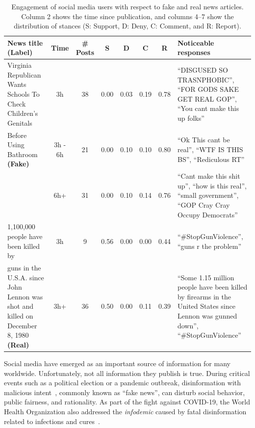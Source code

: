 \documentclass[sigconf]{acmart}
\theoremstyle{definition}
\theoremstyle{hypothesis}
\begin{document}
\begin{table}[tbh]

\caption{Engagement of social media users with respect to fake and real news articles. Column 2 shows the time since publication, and columns 4--7 show the distribution of stances  (S: Support, D: Deny, C: Comment, and R: Report).
}
  \label{table:temporal_engagement}
  \centering
  \small
  \begin{tabular}{p{4cm}ccccccp{6.5cm}}
    \toprule
    \bf News title \textbf{(Label)} & \bf Time & \bf \# Posts & \bf S & \bf D & \bf C & \bf R & \bf Noticeable responses \\ 
    \midrule
  Virginia Republican Wants Schools To Check Children's Genitals & 3h & 38 & 0.00 & 0.03 & 0.19 & 0.78 & ``DISGUSED SO TRASNPHOBIC'', ``FOR GODS SAKE  GET REAL GOP'', ``You cant make this up folks'' \\ \cline{2-8}
  Before Using Bathroom \textbf{(Fake)}  & 3h - 6h & 21  & 0.00 & 0.10 & 0.10 & 0.80 & ``Ok This cant be real'', ``WTF IS THIS BS'', ``Rediculous RT'' \\ \cline{2-8}
  & 6h+ & 31 & 0.00 & 0.10 & 0.14 & 0.76 & ``Cant make this shit up'', ``how is this real'', ``small government'', ``GOP Cray Cray  Occupy Democrats'' \\ \hline
  1,100,000 people have been killed by & 3h & 9 & 0.56 & 0.00 & 0.00 & 0.44 & ``\#StopGunViolence'', ``guns r the problem'' \\ \cline{2-8}
  guns in the U.S.A. since John Lennon was shot and killed on December 8, 1980 \textbf{(Real)} & 3h+ & 36 & 0.50 & 0.00 & 0.11 & 0.39 & ``Some 1.15 million people have been killed by firearms in the United States since Lennon was gunned down'', ``\#StopGunViolence'' \\ 
  \bottomrule
  \end{tabular}
\end{table}

Social media have emerged as an important source of information for many worldwide. Unfortunately, not all information they publish is true.
During critical events such as a political election or a pandemic outbreak, disinformation with malicious intent~\cite{shu2017fake}, commonly known as ``fake news'', can disturb social behavior, public fairness, and rationality. As part of the fight against COVID-19, the World Health Organization also addressed the \textit{infodemic} caused by fatal disinformation related to infections and cures~\cite{thomas_2020}.
\end{document}
